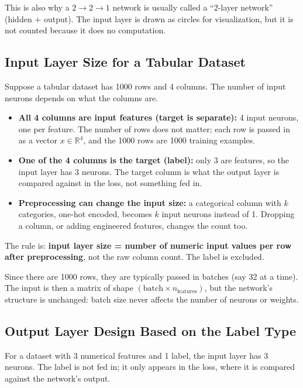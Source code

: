 This is also why a $2 \to 2 \to 1$ network is usually called a ``2-layer network'' (hidden + output). The input layer is drawn as circles for visualization, but it is not counted because it does no computation.

\subsection*{Input Layer Size for a Tabular Dataset}

Suppose a tabular dataset has 1000 rows and 4 columns. The number of input neurons depends on what the columns are.

\begin{itemize}
    \item \textbf{All 4 columns are input features (target is separate):} 4 input neurons, one per feature. The number of rows does not matter; each row is passed in as a vector $x \in \mathbb{R}^4$, and the 1000 rows are 1000 training examples.
    \item \textbf{One of the 4 columns is the target (label):} only 3 are features, so the input layer has 3 neurons. The target column is what the output layer is compared against in the loss, not something fed in.
    \item \textbf{Preprocessing can change the input size:} a categorical column with $k$ categories, one-hot encoded, becomes $k$ input neurons instead of 1. Dropping a column, or adding engineered features, changes the count too.
\end{itemize}

The rule is: \textbf{input layer size = number of numeric input values per row after preprocessing}, not the raw column count. The label is excluded.

Since there are 1000 rows, they are typically passed in batches (say 32 at a time). The input is then a matrix of shape $(\text{batch} \times n_{\text{features}})$, but the network's structure is unchanged: batch size never affects the number of neurons or weights.

\subsection*{Output Layer Design Based on the Label Type}

For a dataset with 3 numerical features and 1 label, the input layer has 3 neurons. The label is not fed in; it only appears in the loss, where it is compared against the network's output.

